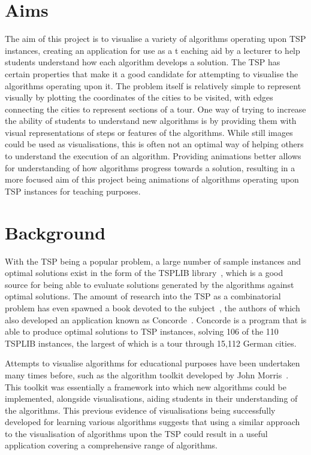 \documentclass{l4proj}
\begin{document}
\section{Aims}
The aim of this project is to visualise a variety of algorithms operating upon TSP instances, creating an application for use as a t
eaching aid by a lecturer to help students understand how each algorithm develops a solution. The TSP has certain properties that make 
it a good candidate for attempting to visualise the algorithms operating upon it. The problem itself is relatively simple to represent 
visually by plotting the coordinates of the cities to be visited, with edges connecting the cities to represent sections of a tour. 
One way of trying to increase the ability of students to understand new algorithms is by providing them with visual representations of 
steps or features of the algorithms. While still images could be used as visualisations, this is often not an optimal way of helping 
others to understand the execution of an algorithm. Providing animations better allows for understanding of how algorithms progress 
towards a solution, resulting in a more focused aim of this project being animations of algorithms operating upon TSP instances for 
teaching purposes.

\section{Background}
With the TSP being a popular problem, a large number of sample instances and optimal solutions exist in the form of the 
TSPLIB library~\cite{TSPLIBsite}, which is a good source for being able to evaluate solutions generated by the algorithms against 
optimal solutions. The amount of research into the TSP 
as a combinatorial problem has even spawned a book devoted to the subject~\cite{TSPBook}, the authors of which also developed an application known 
as Concorde~\cite{concordeSite}. Concorde is a program that is able to produce optimal solutions to TSP instances, solving 106 of the 110 TSPLIB 
instances, the largest of which is a tour through 15,112 German cities.

Attempts to visualise algorithms for educational purposes have been undertaken many times before, such as the algorithm toolkit developed by 
John Morris~\cite{algAnim}. This toolkit was essentially a framework into which new algorithms could be implemented, alongside visualisations, 
aiding students in their understanding of the algorithms. This previous evidence of visualisations being successfully developed for learning 
various algorithms suggests that using a similar approach to the visualisation of algorithms upon the TSP could result in a useful application 
covering a comprehensive range of algorithms.
\end{document}
